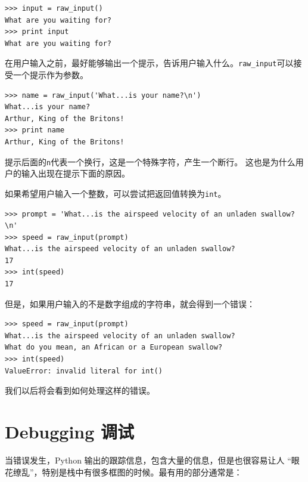 {{


\beforeverb
\begin{verbatim}
>>> input = raw_input()
What are you waiting for?
>>> print input
What are you waiting for?
\end{verbatim}
\afterverb

 在用户输入之前，最好能够输出一个提示，告诉用户输入什么。\verb"raw_input"可以接受一个提示作为参数。


\beforeverb
\begin{verbatim}
>>> name = raw_input('What...is your name?\n')
What...is your name?
Arthur, King of the Britons!
>>> print name
Arthur, King of the Britons!
\end{verbatim}
\afterverb

提示后面的\verb"n"代表一个换行，这是一个特殊字符，产生一个断行。
这也是为什么用户的输入出现在提示下面的原因。


如果希望用户输入一个整数，可以尝试把返回值转换为{\tt int}。

\beforeverb
\begin{verbatim}
>>> prompt = 'What...is the airspeed velocity of an unladen swallow?\n'
>>> speed = raw_input(prompt)
What...is the airspeed velocity of an unladen swallow?
17
>>> int(speed)
17
\end{verbatim}
\afterverb

但是，如果用户输入的不是数字组成的字符串，就会得到一个错误：

\beforeverb
\begin{verbatim}
>>> speed = raw_input(prompt)
What...is the airspeed velocity of an unladen swallow?
What do you mean, an African or a European swallow?
>>> int(speed)
ValueError: invalid literal for int()
\end{verbatim}
\afterverb

我们以后将会看到如何处理这样的错误。



\section{Debugging 调试}
\label{whitespace}

当错误发生，Python 输出的跟踪信息，包含大量的信息，但是也很容易让人
“眼花缭乱”，特别是栈中有很多框图的时候。最有用的部分通常是：

}}
